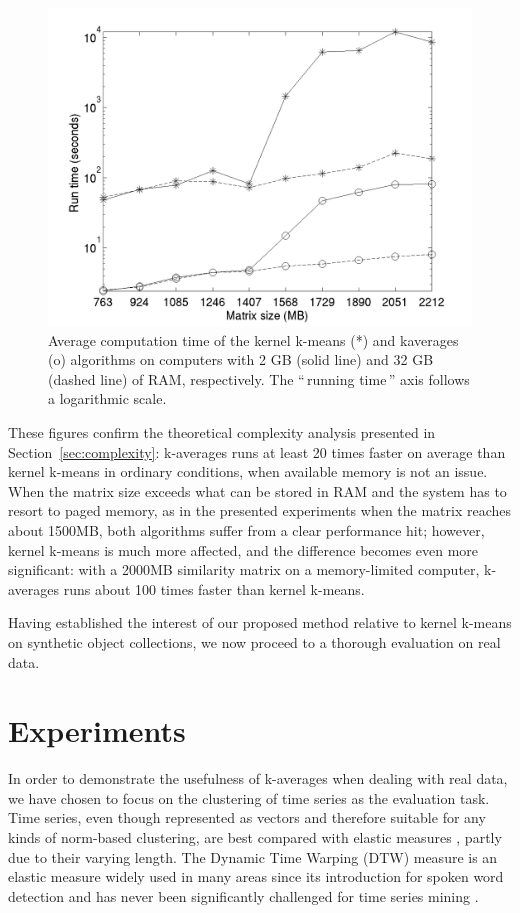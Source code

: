 \documentclass[natbib,smallextended]{svjour3}
\newcommand{\gl}[1]{``\,#1\,''} %
\begin{document}
\begin{figure}
\center
\includegraphics[width= .7\textwidth]{figures/simpleSwap.png}
\caption{Average computation time of the kernel k-means (*) and kaverages (o) algorithms on computers with 2 GB (solid line) and 32 GB (dashed line) of RAM, respectively. The \gl{running time} axis follows a logarithmic scale.}
\label{fig:timing}
\end{figure}

These figures confirm the theoretical complexity analysis presented in Section~\ref{sec:complexity}: k-averages runs at least 20 times faster on average than kernel k-means in ordinary conditions, when  available memory is not an issue. When the matrix size exceeds what can be stored in RAM and the system has to resort to paged memory, as in the presented experiments when the matrix reaches about 1500MB, both algorithms suffer from a clear performance hit; however, kernel k-means is much more affected, and the difference becomes even more significant: with a 2000MB similarity matrix on a memory-limited computer, k-averages runs about 100 times faster than kernel k-means.

Having established the interest of our proposed method relative to kernel k-means on synthetic object collections, we now proceed to a thorough evaluation on real data.

\section{Experiments}
\label{sec:experiments}

In order to demonstrate the usefulness of k-averages when dealing with real data, we have chosen to focus on the clustering of time series as the evaluation task. Time series, even though represented as vectors and therefore suitable for any kinds of norm-based clustering, are best compared with elastic measures \citep{Ding:2008:QMT:1454159.1454226, Wang:2013:ECR:2429736.2429754}, partly due to their varying length. The Dynamic Time Warping (DTW) measure is an elastic measure widely used in many areas since its introduction for spoken word detection \citep{1163055} and has never been significantly challenged for time series mining \citep{conf/kdd/BerndtC94, Rakthanmanon:2013:ABD:2513092.2500489}.
\end{document}
